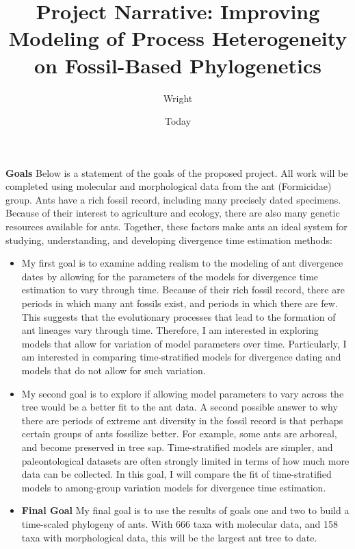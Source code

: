 \documentclass[]{article}
\begin{document}
\title{Project Narrative: Improving Modeling of Process Heterogeneity on Fossil-Based Phylogenetics}
\author{Wright}
\date{Today}
\maketitle

\textbf{Goals}
Below is a statement of the goals of the proposed project. All work will be completed using molecular and morphological data from the ant (Formicidae) group. Ants have a rich fossil record, including many precisely dated specimens.
Because of their interest to agriculture and ecology, there are also many genetic resources available for ants.
Together, these factors make ants an ideal system for studying, understanding, and developing divergence time estimation methods:

\begin{itemize}
\item My first goal is to examine adding realism to the modeling of ant divergence dates by allowing for the parameters of the models for divergence time estimation to vary through time.
Because of their rich fossil record, there are periods in which many ant fossils exist, and periods in which there are few.
This suggests that the evolutionary processes that lead to the formation of ant lineages vary through time.
Therefore, I am interested in exploring models that allow for variation of model parameters over time.
Particularly, I am interested in comparing time-stratified models for divergence dating and models that do not allow for such variation.
\item My second goal is to explore if allowing model parameters to vary across the tree would be a better fit to the ant data.
A second possible answer to why there are periods of extreme ant diversity in the fossil record is that perhaps certain groups of ants fossilize better.
For example, some ants are arboreal, and become preserved in tree sap.
Time-stratified models are simpler, and paleontological datasets are often strongly limited in terms of how much more data can be collected.
In this goal, I will compare the fit of time-stratified models to among-group variation models for divergence time estimation. 
\item \textbf{Final Goal} My final goal is to use the results of goals one and two to build a time-scaled phylogeny of ants. 
With 666 taxa with molecular data, and 158 taxa with morphological data, this will be the largest ant tree to date.
\par

\end{itemize}


\par
\end{document}

